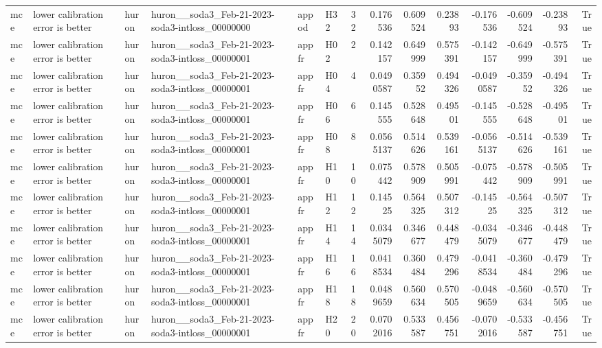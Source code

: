 \begin{longtable}{llllllrrrrrrrr}
mce & lower calibration error is better & huron & huron\_\_soda3\_Feb-21-2023-soda3-intloss\_00000000 & appod & H32 & 32 & 0.176536 & 0.609524 & 0.23893 & -0.176536 & -0.609524 & -0.23893 & True \\
mce & lower calibration error is better & huron & huron\_\_soda3\_Feb-21-2023-soda3-intloss\_00000001 & appfr & H02 & 2 & 0.142157 & 0.649999 & 0.575391 & -0.142157 & -0.649999 & -0.575391 & True \\
mce & lower calibration error is better & huron & huron\_\_soda3\_Feb-21-2023-soda3-intloss\_00000001 & appfr & H04 & 4 & 0.0490587 & 0.35952 & 0.494326 & -0.0490587 & -0.35952 & -0.494326 & True \\
mce & lower calibration error is better & huron & huron\_\_soda3\_Feb-21-2023-soda3-intloss\_00000001 & appfr & H06 & 6 & 0.145555 & 0.528648 & 0.49501 & -0.145555 & -0.528648 & -0.49501 & True \\
mce & lower calibration error is better & huron & huron\_\_soda3\_Feb-21-2023-soda3-intloss\_00000001 & appfr & H08 & 8 & 0.0565137 & 0.514626 & 0.539161 & -0.0565137 & -0.514626 & -0.539161 & True \\
mce & lower calibration error is better & huron & huron\_\_soda3\_Feb-21-2023-soda3-intloss\_00000001 & appfr & H10 & 10 & 0.075442 & 0.578909 & 0.505991 & -0.075442 & -0.578909 & -0.505991 & True \\
mce & lower calibration error is better & huron & huron\_\_soda3\_Feb-21-2023-soda3-intloss\_00000001 & appfr & H12 & 12 & 0.14525 & 0.564325 & 0.507312 & -0.14525 & -0.564325 & -0.507312 & True \\
mce & lower calibration error is better & huron & huron\_\_soda3\_Feb-21-2023-soda3-intloss\_00000001 & appfr & H14 & 14 & 0.0345079 & 0.346677 & 0.448479 & -0.0345079 & -0.346677 & -0.448479 & True \\
mce & lower calibration error is better & huron & huron\_\_soda3\_Feb-21-2023-soda3-intloss\_00000001 & appfr & H16 & 16 & 0.0418534 & 0.360484 & 0.479296 & -0.0418534 & -0.360484 & -0.479296 & True \\
mce & lower calibration error is better & huron & huron\_\_soda3\_Feb-21-2023-soda3-intloss\_00000001 & appfr & H18 & 18 & 0.0489659 & 0.560634 & 0.570505 & -0.0489659 & -0.560634 & -0.570505 & True \\
mce & lower calibration error is better & huron & huron\_\_soda3\_Feb-21-2023-soda3-intloss\_00000001 & appfr & H20 & 20 & 0.0702016 & 0.533587 & 0.456751 & -0.0702016 & -0.533587 & -0.456751 & True \\

\end{longtable}
